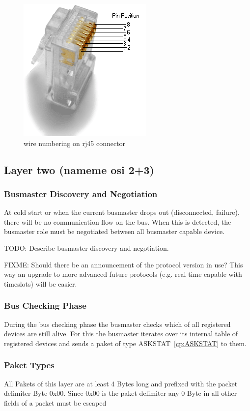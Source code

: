 \documentclass[a4paper,12pt]{scrartcl}
\begin{document}
\begin{figure}
	\centering
	\includegraphics[scale=.7]{png/Rj45plug-8p8c.png}
	\caption{wire numbering on rj45 connector}
	\label{fig:rj45}
\end{figure}

\subsection{Layer two (nameme osi 2+3)}

\subsubsection{Busmaster Discovery and Negotiation}
At cold start or when the current busmaster drops out (disconnected, failure), there will be no communication flow on the bus.
When this is detected, the busmaster role must be negotiated between all busmaster capable device.

TODO: Describe busmaster discovery and negotiation.


FIXME: Should there be an announcement of the protocol version in use?
This way an upgrade to more advanced future protocols (e.g. real time capable with timeslots) will be easier.


\subsubsection{Bus Checking Phase}
During the bus checking phase the busmaster checks which of all registered devices are still alive. For this the busmaster iterates over its internal table of registered devices and sends a paket of type ASKSTAT~\ref{cp:ASKSTAT} to them.

\subsubsection{Paket Types}
All Pakets of this layer are at least 4 Bytes long and prefixed with the packet delimiter Byte 0x00. 
Since 0x00 is the paket delimiter any 0 Byte in all other fields of a packet  must be escaped
\end{document}
